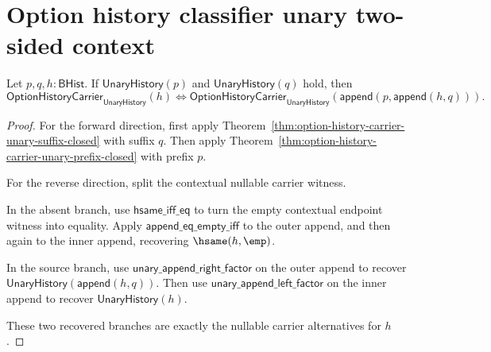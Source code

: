 \section{Option history classifier unary two-sided context}
\label{sec:option-history-classifier-unary-two-sided-context}

\begin{theorem}
\label{thm:option-history-carrier-unary-two-sided-context}
Let $p,q,h:\mathsf{BHist}$. If $\mathsf{UnaryHistory}(p)$ and
$\mathsf{UnaryHistory}(q)$ hold, then
$$
\mathsf{OptionHistoryCarrier}_{\mathsf{UnaryHistory}}(h)
\Longleftrightarrow
\mathsf{OptionHistoryCarrier}_{\mathsf{UnaryHistory}}
  (\mathsf{append}(p,\mathsf{append}(h,q))).
$$
\end{theorem}
\begin{proof}
For the forward direction, first apply
Theorem~\ref{thm:option-history-carrier-unary-suffix-closed} with suffix $q$.
Then apply Theorem~\ref{thm:option-history-carrier-unary-prefix-closed} with
prefix $p$.

For the reverse direction, split the contextual nullable carrier witness.

In the absent branch, use $\mathsf{hsame}\_\mathsf{iff}\_\mathsf{eq}$ to turn
the empty contextual endpoint witness into equality. Apply
$\mathsf{append}\_\mathsf{eq}\_\mathsf{empty}\_\mathsf{iff}$ to the outer
append, and then again to the inner append, recovering $\hsame(h,\emp)$.

In the source branch, use
$\mathsf{unary}\_\mathsf{append}\_\mathsf{right}\_\mathsf{factor}$ on the
outer append to recover $\mathsf{UnaryHistory}(\mathsf{append}(h,q))$. Then
use $\mathsf{unary}\_\mathsf{append}\_\mathsf{left}\_\mathsf{factor}$ on the
inner append to recover $\mathsf{UnaryHistory}(h)$.

These two recovered branches are exactly the nullable carrier alternatives for
$h$.
\end{proof}

